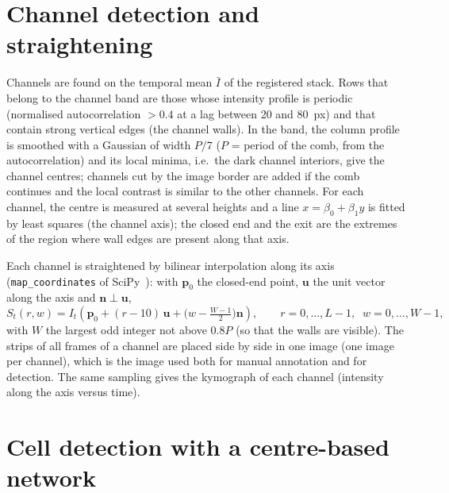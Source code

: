 \documentclass[11pt,a4paper]{article}
\begin{document}
\section{Channel detection and straightening}\label{sec:channels}

Channels are found on the temporal mean $\bar I$ of the registered stack. Rows that belong to the channel band are those whose intensity profile is periodic (normalised autocorrelation $>0.4$ at a lag between \num{20} and \SI{80}{px}) and that contain strong vertical edges (the channel walls). In the band, the column profile is smoothed with a Gaussian of width $P/7$ ($P$ = period of the comb, from the autocorrelation) and its local minima, i.e.\ the dark channel interiors, give the channel centres; channels cut by the image border are added if the comb continues and the local contrast is similar to the other channels. For each channel, the centre is measured at several heights and a line $x=\beta_0+\beta_1 y$ is fitted by least squares (the channel axis); the closed end and the exit are the extremes of the region where wall edges are present along that axis.

Each channel is straightened by bilinear interpolation along its axis (\texttt{map\_\allowbreak coordinates} of SciPy~\cite{virtanen2020}): with $\mathbf p_0$ the closed-end point, $\mathbf u$ the unit vector along the axis and $\mathbf n\perp\mathbf u$,
\begin{equation}
S_t(r,w)=I_t\!\left(\mathbf p_0+(r-10)\,\mathbf u+\bigl(w-\tfrac{W-1}{2}\bigr)\mathbf n\right),\qquad r=0,\dots,L-1,\;\; w=0,\dots,W-1,
\end{equation}
with $W$ the largest odd integer not above $0.8P$ (so that the walls are visible). The strips of all frames of a channel are placed side by side in one image (one image per channel), which is the image used both for manual annotation and for detection. The same sampling gives the kymograph of each channel (intensity along the axis versus time).

\section{Cell detection with a centre-based network}\label{sec:detector}
\end{document}
